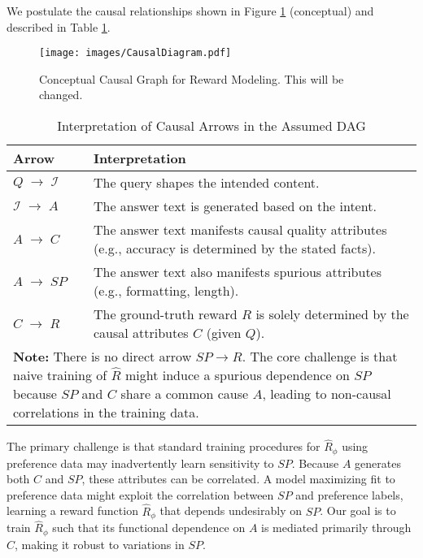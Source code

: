 We postulate the causal relationships shown in Figure \ref{fig:causal_graph} (conceptual) and described in Table \ref{tab:causal_arrows_revised}.

\begin{figure}[t!]
\centering
\texttt{[image: images/CausalDiagram.pdf]}
\caption{Conceptual Causal Graph for Reward Modeling. This will be changed.}
\label{fig:causal_graph}
\end{figure}

\begin{table}[ht!]
\centering
\caption{Interpretation of Causal Arrows in the Assumed DAG}
\label{tab:causal_arrows_revised}
\vspace{1em}
\begin{tabular}{p{3cm} p{9cm}} %
\toprule
\textbf{Arrow} & \textbf{Interpretation} \\
\midrule
\(Q \;\to\; \mathcal{I}\) & The query shapes the intended content. \\
\(\mathcal{I} \;\to\; A\) & The answer text is generated based on the intent. \\
\(A \;\to\; C\) & The answer text manifests causal quality attributes (e.g., accuracy is determined by the stated facts). \\
\(A \;\to\; SP\) & The answer text also manifests spurious attributes (e.g., formatting, length). \\
\(C \;\to\; R\) & The ground-truth reward $R$ is solely determined by the causal attributes $C$ (given $Q$). \\
\midrule
\multicolumn{2}{p{12cm}}{\textbf{Note:} There is no direct arrow $SP \to R$. The core challenge is that naive training of $\hat{R}$ might induce a spurious dependence on $SP$ because $SP$ and $C$ share a common cause $A$, leading to non-causal correlations in the training data.} \\
\bottomrule
\end{tabular}
\end{table}

The primary challenge is that standard training procedures for $\hat{R}_\phi$ using preference data may inadvertently learn sensitivity to $SP$. Because $A$ generates both $C$ and $SP$, these attributes can be correlated. A model maximizing fit to preference data might exploit the correlation between $SP$ and preference labels, learning a reward function $\hat{R}_\phi$ that depends undesirably on $SP$. Our goal is to train $\hat{R}_\phi$ such that its functional dependence on $A$ is mediated primarily through $C$, making it robust to variations in $SP$.

